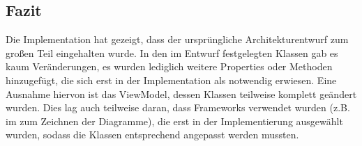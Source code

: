 \subsection*{Fazit}

Die Implementation hat gezeigt, dass der ursprüngliche Architekturentwurf zum großen Teil eingehalten wurde. In den im Entwurf festgelegten Klassen gab es kaum Veränderungen, es wurden lediglich weitere Properties oder Methoden hinzugefügt, die sich erst in der Implementation als notwendig erwiesen. Eine Ausnahme hiervon ist das ViewModel, dessen Klassen teilweise 
komplett geändert wurden. Dies lag auch teilweise daran, dass Frameworks verwendet wurden (z.B. im  zum Zeichnen der Diagramme), die erst in der Implementierung ausgewählt wurden, sodass die Klassen entsprechend angepasst werden mussten.
